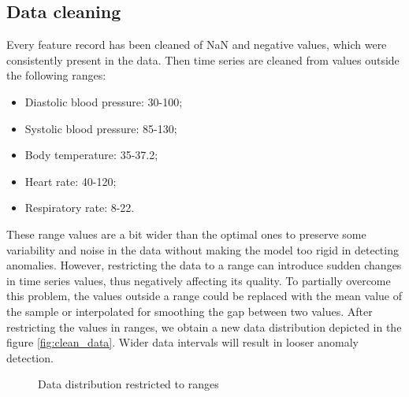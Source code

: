 \documentclass{article}
\begin{document}
\begin{multicols*}{2}
\subsection{Data cleaning}
Every feature record has been cleaned of NaN and negative values, which were consistently present in the data. Then time series are cleaned from values outside the following ranges:

		\begin{itemize}
				\setlength\itemsep{-0.1em}
			\item Diastolic blood pressure: 30-100;
			\item Systolic blood pressure: 85-130;
			\item Body temperature: 35-37.2;
			\item Heart rate: 40-120;
			\item Respiratory rate: 8-22.
		\end{itemize}
These range values are a bit wider than the optimal ones to preserve some variability and noise in the data without making the model too rigid in detecting anomalies. However, restricting the data to a range can introduce sudden changes in time series values, thus negatively affecting its quality. To partially overcome this problem, the values outside a range could be replaced with the mean value of the sample or interpolated for smoothing the gap between two values. After restricting the values in ranges, we obtain a new data distribution depicted in the figure \ref{fig:clean_data}. Wider data intervals will result in looser anomaly detection.
\begin{figure}[H]
			\centering
			\caption{Data distribution restricted to ranges}
\end{figure}

\end{multicols*}
\end{document}

